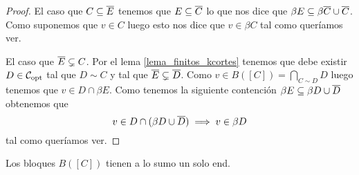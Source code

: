 \documentclass[tesis.tex]{subfiles}
\begin{document}
\begin{proof}
	El caso que $C \subseteq \overline E$ tenemos que $ E \subseteq \overline C$ lo que nos dice que $\beta E \subseteq \beta \overline C \cup \overline C$.
	Como suponemos que $v \in C$ luego esto nos dice que $v \in \beta C$ tal como queríamos ver.
	
	El caso que $\overline E \subsetneq C$.
	Por el lema \ref{lema_finitos_kcortes} tenemos que debe existir $D \in {\cal C}_{\text{opt}}$ tal que $D \sim C$ y tal que $\overline E \subsetneq \overline D$.
	Como $v \in B([C]) = \bigcap_{C \sim D} D $ luego tenemos que $v \in D \cap \beta E$.
	Como tenemos la siguiente contención $\beta E \subseteq \beta D \cup \overline D$ obtenemos que
	\[
		v \in D \cap (\beta D \cup \overline D) \implies v \in \beta D
	\]
	tal como queríamos ver. 
\end{proof}


\begin{lema}
	Los bloques $B([C])$ tienen a lo sumo un solo end.
\end{lema}
\end{document}
